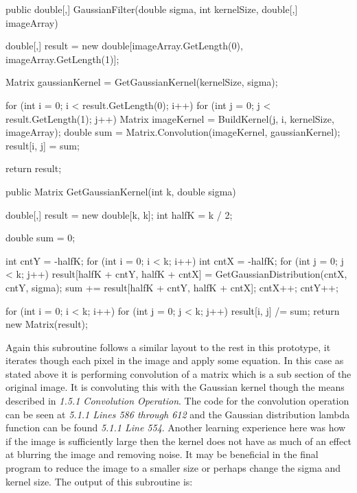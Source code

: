 \begin{FlushLeft}
        \begin{cscode}
public double[,] GaussianFilter(double sigma, int kernelSize, double[,] imageArray)
{
    double[,] result = new double[imageArray.GetLength(0), imageArray.GetLength(1)];

    Matrix gaussianKernel = GetGaussianKernel(kernelSize, sigma);

    for (int i = 0; i < result.GetLength(0); i++)
    {
        for (int j = 0; j < result.GetLength(1); j++)
        {
            Matrix imageKernel = BuildKernel(j, i, kernelSize, imageArray);
            double sum = Matrix.Convolution(imageKernel, gaussianKernel);
            result[i, j] = sum;
        }
    }

    return result;
}
        
public Matrix GetGaussianKernel(int k, double sigma)
{
    double[,] result = new double[k, k];
    int halfK = k / 2;

    double sum = 0;

    int cntY = -halfK;
    for (int i = 0; i < k; i++)
    {
        int cntX = -halfK;
        for (int j = 0; j < k; j++)
        {
            result[halfK + cntY, halfK + cntX] = GetGaussianDistribution(cntX, cntY, sigma);
            sum += result[halfK + cntY, halfK + cntX];
            cntX++;
        }
        cntY++;
    }

    for (int i = 0; i < k; i++) for (int j = 0; j < k; j++) result[i, j] /= sum;
    return new Matrix(result);
}
        \end{cscode}
        
        Again this subroutine follows a similar layout to the rest in this prototype, it iterates though each pixel in the image and apply some equation. In this case as stated above it is performing convolution of a matrix which is a sub section of the original image. It is convoluting this with the Gaussian kernel though the means described in \textit{1.5.1 Convolution Operation}. The code for the convolution operation can be seen at \textit{5.1.1 Lines 586 through 612} and the Gaussian distribution lambda function can be found \textit{5.1.1 Line 554}. Another learning experience here was how if the image is sufficiently large then the kernel does not have as much of an effect at blurring the image and removing noise. It may be beneficial in the final program to reduce the image to a smaller size or perhaps change the sigma and kernel size. The output of this subroutine is: \\ \bk


\end{FlushLeft}

